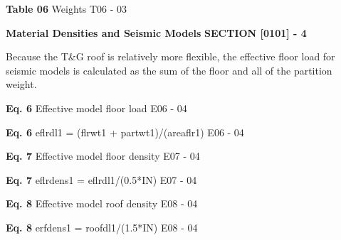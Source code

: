 \documentclass[12pt,notitle,letterpaper]{report}
\newenvironment{DUlineblock}[1]{%
    \list{}{\setlength{\partopsep}{\parskip}
            \addtolength{\partopsep}{\baselineskip}
            \setlength{\topsep}{0pt}
            \setlength{\itemsep}{0.15\baselineskip}
            \setlength{\parsep}{0pt}
            \setlength{\leftmargin}{#1}}
    \raggedright
  }
  {\endlist}
\begin{document}
\textbf{Table 06} Weights \hfill T06 - 03

\pagebreak

\vspace{.2in}   \textbf{Material Densities and Seismic Models}   \hfill\textbf{SECTION [0101] - 4}
\newline   \vspace{.05in}   {\color{black}\hrulefill}

Because the T\&G roof is relatively more flexible, the effective floor load
for seismic models is calculated as the sum of the floor and all of the
partition weight.

\begin{DUlineblock}{0em}
\item[] 
\end{DUlineblock}

\textbf{Eq. 6} Effective model floor load \hfill E06 - 04

\begin{DUlineblock}{0em}
\item[] 
\end{DUlineblock}

\textbf{Eq. 6} eflrdl1 = (flrwt1 + partwt1)/(areaflr1) \hfill E06 - 04

\begin{DUlineblock}{0em}
\item[] 
\end{DUlineblock}

\textbf{Eq. 7} Effective model floor density \hfill E07 - 04

\begin{DUlineblock}{0em}
\item[] 
\end{DUlineblock}

\textbf{Eq. 7} eflrdens1 = eflrdl1/(0.5*IN) \hfill E07 - 04

\begin{DUlineblock}{0em}
\item[] 
\end{DUlineblock}

\textbf{Eq. 8} Effective model roof density \hfill E08 - 04

\begin{DUlineblock}{0em}
\item[] 
\end{DUlineblock}

\textbf{Eq. 8} erfdens1 = roofdl1/(1.5*IN) \hfill E08 - 04

\begin{DUlineblock}{0em}
\item[] 
\end{DUlineblock}
\end{document}
